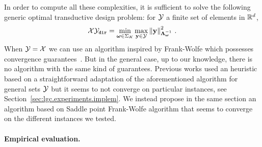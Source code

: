 \begin{remark}
\begin{leftbar}[remarkbar]
In order to compute all these complexities, it is sufficient to solve the following generic optimal transductive design problem: for $\mathcal{Y}$ a finite set of elements in $\mathbb{R}^d$,
\[
\mathcal{X}\mathcal{Y}_{\texttt{dir}}=\min_{{\boldsymbol \omega}\in\Sigma_K}\max_{{\bf y}\in\mathcal{Y}}\left\lVert{\bf y}\right\rVert^2_{{\boldsymbol \Lambda}_{{\boldsymbol \omega}}^{-1}}\,.
\]
When $\mathcal{Y}=\mathcal{X}$ we can use an algorithm inspired by Frank-Wolfe \citep{frank1956algorithm} which possesses convergence guarantees~\citep{atwood1969optimal,ahipasaoglu2008fw}. But in the general case, up to our knowledge, there is no algorithm with the same kind of guarantees. Previous works used an heuristic based on a straightforward adaptation of the aforementioned algorithm for general sets $\mathcal{Y}$ but it seems to not converge on particular instances, see Section~\ref{sec:lgc.experiments.implem}. We instead propose in the same section an algorithm based on Saddle point Frank-Wolfe algorithm that seems to converge on the different instances we tested.
\end{leftbar}
\end{remark}

\paragraph{Empirical evaluation.}


